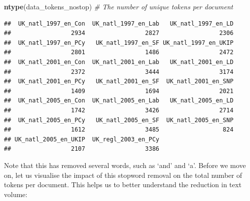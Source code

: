 \documentclass[
]{book}
\newenvironment{Shaded}{\begin{snugshade}}{\end{snugshade}}
\newcommand{\CommentTok}[1]{\textcolor[rgb]{0.56,0.35,0.01}{\textit{#1}}}
\newcommand{\FunctionTok}[1]{\textcolor[rgb]{0.13,0.29,0.53}{\textbf{#1}}}
\newcommand{\NormalTok}[1]{#1}
\begin{document}
\begin{Shaded}
\begin{Highlighting}[]
\FunctionTok{ntype}\NormalTok{(data\_tokens\_nostop)  }\CommentTok{\# The number of unique tokens per document}
\end{Highlighting}
\end{Shaded}

\begin{verbatim}
##  UK_natl_1997_en_Con  UK_natl_1997_en_Lab   UK_natl_1997_en_LD 
##                 2934                 2827                 2306 
##  UK_natl_1997_en_PCy   UK_natl_1997_en_SF UK_natl_1997_en_UKIP 
##                 2801                 1486                 2472 
##  UK_natl_2001_en_Con  UK_natl_2001_en_Lab   UK_natl_2001_en_LD 
##                 2372                 3444                 3174 
##  UK_natl_2001_en_PCy   UK_natl_2001_en_SF  UK_natl_2001_en_SNP 
##                 1409                 1694                 2021 
##  UK_natl_2005_en_Con  UK_natl_2005_en_Lab   UK_natl_2005_en_LD 
##                 1742                 3426                 2714 
##  UK_natl_2005_en_PCy   UK_natl_2005_en_SF  UK_natl_2005_en_SNP 
##                 1612                 3485                  824 
## UK_natl_2005_en_UKIP  UK_regl_2003_en_PCy 
##                 2107                 3386
\end{verbatim}

Note that this has removed several words, such as `and' and `a'. Before we move on, let us visualise the impact of this stopword removal on the total number of tokens per document. This helps us to better understand the reduction in text volume:
\end{document}

